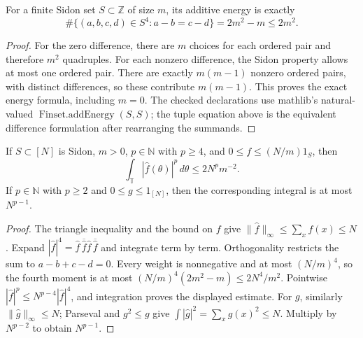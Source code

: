 \begin{lemma}
\label{app:sidon-energy}
\leanok
{}
For a finite Sidon set $S\subset\mathbb Z$ of size $m$, its additive energy
is exactly
\[
 \#\{(a,b,c,d)\in S^4:a-b=c-d\}=2m^2-m\leq2m^2.
\]
\end{lemma}
\begin{proof}
For the zero difference, there are $m$ choices for each ordered pair and
therefore $m^2$ quadruples.  For each nonzero difference, the Sidon property
allows at most one ordered pair.  There are exactly $m(m-1)$ nonzero
ordered pairs, with distinct differences, so these contribute $m(m-1)$.
This proves the exact energy formula, including $m=0$.
The checked declarations use mathlib's natural-valued
$\operatorname{Finset.addEnergy}(S,S)$; the tuple equation above is the
equivalent difference formulation after rearranging the summands.
\end{proof}

\begin{lemma}
\label{app:sidon-fourth-moment}
If $S\subset[N]$ is Sidon, $m>0$, $p\in\mathbb N$ with $p\geq4$, and
$0\leq f\leq(N/m)1_S$, then
\[
 \int_{\mathbb T}|\widehat f(\theta)|^p\,d\theta
 \leq2N^{p}m^{-2}.
\]
If $p\in\mathbb N$ with $p\geq2$ and $0\leq g\leq1_{[N]}$, then the corresponding integral
is at most $N^{p-1}$.
\end{lemma}
\begin{proof}
The triangle inequality and the bound on $f$ give
$\|\widehat f\|_\infty\leq\sum_xf(x)\leq N$.
Expand $|\widehat f|^4=\widehat f\,\overline{\widehat f}
\widehat f\,\overline{\widehat f}$ and integrate term by term.
Orthogonality restricts the sum to $a-b+c-d=0$.
Every weight is nonnegative and at most $(N/m)^4$, so the fourth moment
is at most $(N/m)^4(2m^2-m)\leq2N^4/m^2$.
Pointwise $|\widehat f|^p\leq N^{p-4}|\widehat f|^4$, and integration
proves the displayed estimate.
For $g$, similarly $\|\widehat g\|_\infty\leq N$; Parseval and $g^2\leq g$
give $\int|\widehat g|^2=\sum_xg(x)^2\leq N$.
Multiply by $N^{p-2}$ to obtain $N^{p-1}$.
\end{proof}

